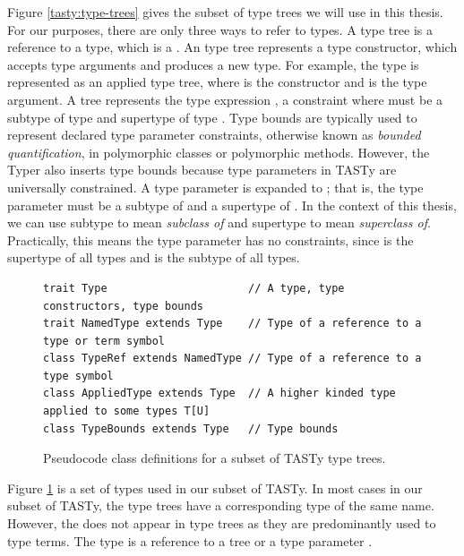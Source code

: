 Figure \ref{tasty:type-trees} gives the subset of type trees we will use in this thesis.
For our purposes, there are only three ways to refer to types.
A  type tree is a reference to a type, which is a .
An  type tree represents a type constructor, which accepts type arguments and produces a new type.
For example, the type  is represented as an applied type tree, where  is the constructor and  is the type argument.
A  tree represents the type expression , a constraint where  must be a subtype of type  and supertype of type .
Type bounds are typically used to represent declared type parameter constraints, otherwise known as \textit{bounded quantification}\cite{systemF:subtyping}, in polymorphic classes or polymorphic methods.
However, the Typer also inserts type bounds because type parameters in TASTy are universally constrained.
A type parameter  is expanded to ; that is, the type parameter  must be a subtype of  and a supertype of .
In the context of this thesis, we can use subtype to mean \textit{subclass of} and supertype to mean \textit{superclass of}.
Practically, this means the type parameter  has no constraints, since  is the supertype of all types and  is the subtype of all types.

\begin{figure}[!htb]
\begin{verbatim}
trait Type                      // A type, type constructors, type bounds
trait NamedType extends Type    // Type of a reference to a type or term symbol
class TypeRef extends NamedType // Type of a reference to a type symbol
class AppliedType extends Type  // A higher kinded type applied to some types T[U]
class TypeBounds extends Type   // Type bounds
\end{verbatim} 
\caption{Pseudocode class definitions for a subset of TASTy type trees.}
\label{tasty:types}
\end{figure}

Figure \ref{tasty:types} is a set of types used in our subset of TASTy.
In most cases in our subset of TASTy, the type trees have a corresponding type of the same name.
However, the  does not appear in type trees as they are predominantly used to type terms.
The  type is a reference to a  tree or a type parameter .

